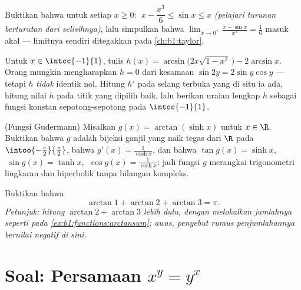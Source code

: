 \begin{exercise}[$\star\star$]\label{exo:b1:functions:9}
Buktikan bahwa untuk setiap $x \geq 0$: $\;x - \dfrac{x^3}{6} \leq \sin x \leq
x$ \emph{(pelajari turunan berturutan dari selisihnya)}, lalu
simpulkan bahwa $\lim_{x \to 0^+} \frac{x - \sin x}{x^3} = \frac 16$
masuk akal --- limitnya sendiri ditegakkan pada
\cref{ch:b1:taylor}.
\end{exercise}

\begin{exercise}[$\star\star\star$]\label{exo:b1:functions:10}
Untuk $x \in \intcc{-1}{1}$, tulis
$h(x) = \arcsin\bigl(2x\sqrt{1 - x^2}\,\bigr) - 2\arcsin x$. Orang mungkin
mengharapkan $h = 0$ dari kesamaan $\sin 2y = 2\sin y\cos y$ --- tetapi
$h$ \emph{tidak} identik nol. Hitung $h'$ pada selang terbuka
yang di situ ia ada, hitung nilai $h$ pada titik yang dipilih baik, lalu berikan
uraian lengkap $h$ sebagai fungsi konstan sepotong-sepotong pada $\intcc{-1}{1}$.
\end{exercise}

\begin{exercise}[$\star\star\star$]\label{exo:b1:functions:11}
(Fungsi Gudermann) Misalkan $g(x) = \arctan(\sinh x)$ untuk $x \in \R$. Buktikan
bahwa $g$ adalah bijeksi ganjil yang naik tegas dari $\R$ pada
$\intoo{-\frac\pi2}{\frac\pi2}$, bahwa $g'(x) = \frac{1}{\cosh x}$,
dan bahwa $\tan g(x) = \sinh x$, $\;\sin g(x) = \tanh x$,
$\;\cos g(x) = \frac{1}{\cosh x}$: jadi fungsi $g$ merangkai trigonometri
lingkaran dan hiperbolik tanpa bilangan kompleks.
\end{exercise}

\begin{exercise}[$\star\star$]\label{exo:b1:functions:12}
Buktikan bahwa
\[
\arctan 1 + \arctan 2 + \arctan 3 = \pi .
\]
\emph{Petunjuk: hitung $\arctan 2 + \arctan 3$ lebih dulu, dengan melokalkan
jumlahnya seperti pada \cref{ex:b1:functions:arctansum}; awas, penyebut
rumus penjumlahannya bernilai negatif di sini.}
\end{exercise}

\section{Soal: Persamaan $x^y = y^x$}

